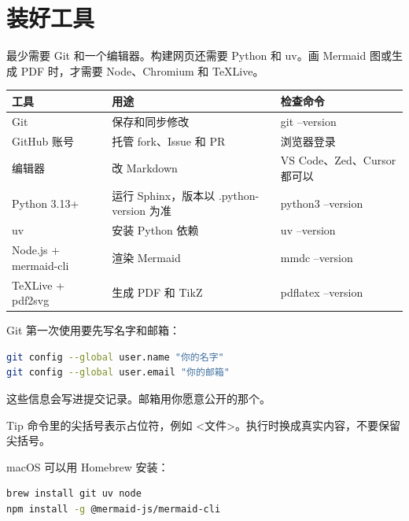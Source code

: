 \documentclass[UTF8,fontset=none,a4paper,11pt]{ctexart}
\newcommand{\code}[1]{{\CJKsetecglue{}\ttfamily #1}}
\begin{document}
\clearpage

\section{装好工具}\label{sec:setup-tools}

最少需要 Git 和一个编辑器。构建网页还需要 Python 和 uv。画 Mermaid 图或生成 PDF 时，才需要 Node、Chromium 和 TeXLive。

\begin{center}
\small
\begin{tabularx}{\linewidth}{@{}L{3.8cm}L{4.8cm}Y@{}}
\toprule
工具 & 用途 & 检查命令 \\
\midrule
Git & 保存和同步修改 & \code{git --version} \\
GitHub 账号 & 托管 fork、Issue 和 PR & 浏览器登录 \\
编辑器 & 改 Markdown & VS Code、Zed、Cursor 都可以 \\
Python 3.13+ & 运行 Sphinx，版本以 \code{.python-version} 为准 & \code{python3 --version} \\
uv & 安装 Python 依赖 & \code{uv --version} \\
Node.js + mermaid-cli & 渲染 Mermaid & \code{mmdc --version} \\
TeXLive + pdf2svg & 生成 PDF 和 TikZ & \code{pdflatex --version} \\
\bottomrule
\end{tabularx}
\end{center}

Git 第一次使用要先写名字和邮箱：

\begin{lstlisting}[language=bash]
git config --global user.name "你的名字"
git config --global user.email "你的邮箱"
\end{lstlisting}

这些信息会写进提交记录。邮箱用你愿意公开的那个。

\begin{tipbox}{Tip}
命令里的尖括号表示占位符，例如 \code{<文件>}。执行时换成真实内容，不要保留尖括号。
\end{tipbox}

macOS 可以用 Homebrew 安装：

\begin{lstlisting}[language=bash]
brew install git uv node
npm install -g @mermaid-js/mermaid-cli
\end{lstlisting}
\end{document}
